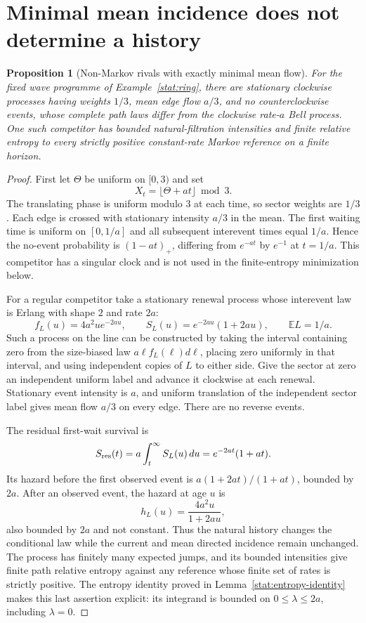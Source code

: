 \documentclass[11pt,oneside,openany]{book}
\newtheorem{proposition}[theorem]{Proposition}
\theoremstyle{definition}
\theoremstyle{remark}\newtheorem{remark}[theorem]{Remark}
\begin{document}
\section{Minimal mean incidence does not determine a history}

\begin{proposition}[Non-Markov rivals with exactly minimal mean flow]
\label{stat:renewal}
For the fixed wave programme of Example~\ref{stat:ring}, there are stationary
clockwise processes having weights $1/3$, mean edge flow $a/3$, and no
counterclockwise events, whose complete path laws differ from the clockwise
rate-$a$ Bell process. One such competitor has bounded natural-filtration
intensities and finite relative entropy to every strictly positive
constant-rate Markov reference on a finite horizon.
\end{proposition}
\begin{proof}
First let $\Theta$ be uniform on $[0,3)$ and set
\[
 X_t=\lfloor\Theta+at\rfloor\bmod3.
\]
The translating phase is uniform modulo $3$ at each time, so sector weights
are $1/3$. Each edge is crossed with stationary intensity $a/3$ in the mean.
The first waiting time is uniform on $[0,1/a]$ and all subsequent interevent
times equal $1/a$. Hence the no-event probability is $(1-at)_+$, differing
from $e^{-at}$ by $e^{-1}$ at $t=1/a$. This competitor has a singular clock
and is not used in the finite-entropy minimization below.

For a regular competitor take a stationary renewal process whose interevent
law is Erlang with shape $2$ and rate $2a$:
\[
 f_L(u)=4a^2u e^{-2au},\qquad
 S_L(u)=e^{-2au}(1+2au),\qquad \mathbb E L=1/a.
\]
Such a process on the line can be constructed by taking the interval
containing zero from the size-biased law $a\ell f_L(\ell)d\ell$, placing zero
uniformly in that interval, and using independent copies of $L$ to either
side. Give the sector at zero an independent uniform label and advance it
clockwise at each renewal. Stationary event intensity is $a$, and uniform
translation of the independent sector label gives mean flow $a/3$ on every
edge. There are no reverse events.

The residual first-wait survival is
\begin{equation}\label{stat:erlang-survival}
 S_{\rm res}(t)=a\int_t^\infty S_L(u)\,du
              =e^{-2at}(1+at).
\end{equation}
Its hazard before the first observed event is
$a(1+2at)/(1+at)$, bounded by $2a$. After an observed event, the hazard at
age $u$ is
\begin{equation}\label{stat:erlang-hazard}
 h_L(u)=\frac{4a^2u}{1+2au},
\end{equation}
also bounded by $2a$ and not constant. Thus the natural history changes the
conditional law while the current and mean directed incidence remain
unchanged. The process has finitely many expected jumps, and its bounded
intensities give finite path relative entropy against any reference whose
finite set of rates is strictly positive. The entropy identity proved in
Lemma~\ref{stat:entropy-identity} makes this last assertion explicit: its
integrand is bounded on $0\leq\lambda\leq2a$, including $\lambda=0$.
\end{proof}
\end{document}
